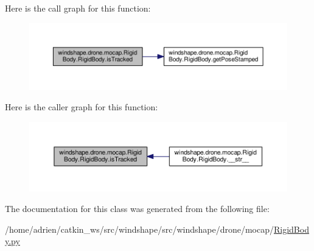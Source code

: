 Here is the call graph for this function\+:\nopagebreak
\begin{figure}[H]
\begin{center}
\leavevmode
\includegraphics[width=350pt]{classwindshape_1_1drone_1_1mocap_1_1_rigid_body_1_1_rigid_body_ad094c24d63255feeb6280825e7731596_cgraph}
\end{center}
\end{figure}
Here is the caller graph for this function\+:\nopagebreak
\begin{figure}[H]
\begin{center}
\leavevmode
\includegraphics[width=350pt]{classwindshape_1_1drone_1_1mocap_1_1_rigid_body_1_1_rigid_body_ad094c24d63255feeb6280825e7731596_icgraph}
\end{center}
\end{figure}


The documentation for this class was generated from the following file\+:\begin{DoxyCompactItemize}
\item 
/home/adrien/catkin\+\_\+ws/src/windshape/src/windshape/drone/mocap/\mbox{\hyperlink{_rigid_body_8py}{Rigid\+Body.\+py}}\end{DoxyCompactItemize}
